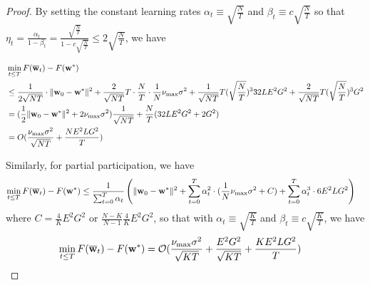 \begin{proof}
	By setting the constant learning rates $\alpha_{t}\equiv\sqrt{\frac{N}{T}}$
	and $\beta_{t}\equiv c\sqrt{\frac{N}{T}}$ so that $\eta_{t}=\frac{\alpha_{t}}{1-\beta_{t}}=\frac{\sqrt{\frac{N}{T}}}{1-c\sqrt{\frac{N}{T}}}\leq2\sqrt{\frac{N}{T}}$,
	we have 
	
	\begin{align*}
	&\min_{t\leq T}F({\overline{\mathbf{w}}}_{t})-F({\mathbf{w}}^{\ast})\\
	 & \leq\frac{1}{2\sqrt{NT}}\cdot\|{\mathbf{w}}_{0}-{\mathbf{w}}^{\ast}\|^{2}+\frac{2}{\sqrt{NT}}T\cdot\frac{N}{T}\cdot\frac{1}{N}\nu_{\max}\sigma^{2}+\frac{1}{\sqrt{NT}}T(\sqrt{\frac{N}{T}})^{3}32LE^{2}G^{2}+\frac{2}{\sqrt{NT}}T(\sqrt{\frac{N}{T}})^{3}G^{2}\\
	& =(\frac{1}{2}\|{\mathbf{w}}_{0}-{\mathbf{w}}^{\ast}\|^{2}+2\nu_{\max}\sigma^{2})\frac{1}{\sqrt{NT}}+\frac{N}{T}(32LE^{2}G^{2}+2G^{2})\\
	& =O(\frac{\nu_{\max}\sigma^{2}}{\sqrt{NT}}+\frac{NE^{2}LG^{2}}{T})
	\end{align*}
	
	Similarly, for partial participation, we have 
	\begin{align*}
	\min_{t\leq T}F({\overline{\mathbf{w}}}_{t})-F({\mathbf{w}}^{\ast}) & \leq\frac{1}{\sum_{t=0}^{T}\alpha_{t}}\left(\|{\mathbf{w}}_{0}-{\mathbf{w}}^{\ast}\|^{2}+\sum_{t=0}^{T}\alpha_{t}^{2}\cdot(\frac{1}{N}\nu_{\max}\sigma^{2}+C)+\sum_{t=0}^{T}\alpha_{t}^{3}\cdot6E^{2}LG^{2}\right)
	\end{align*}
	where $C=\frac{4}{K}E^{2}G^{2}$ or $\frac{N-K}{N-1}\frac{4}{K}E^{2}G^{2}$,
	so that with $\alpha_{t}\equiv\sqrt{\frac{K}{T}}$ and $\beta_{t}\equiv c\sqrt{\frac{K}{T}}$,
	we have 
	\begin{align*}
	\min_{t\leq T}F({\overline{\mathbf{w}}}_{t})-F({\mathbf{w}}^{\ast}) & =\mathcal{O}(\frac{\nu_{\max}\sigma^{2}}{\sqrt{KT}}+\frac{E^{2}G^{2}}{\sqrt{KT}}+\frac{KE^{2}LG^{2}}{T})
	\end{align*}
\end{proof}